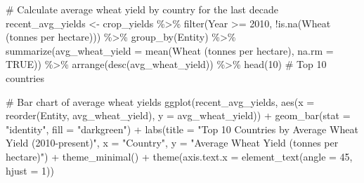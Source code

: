 \documentclass[
  letterpaper,
]{book}
\newenvironment{Shaded}{\begin{snugshade}}{\end{snugshade}}
\newcommand{\AttributeTok}[1]{\textcolor[rgb]{0.40,0.45,0.13}{#1}}
\newcommand{\CommentTok}[1]{\textcolor[rgb]{0.37,0.37,0.37}{#1}}
\newcommand{\ConstantTok}[1]{\textcolor[rgb]{0.56,0.35,0.01}{#1}}
\newcommand{\DecValTok}[1]{\textcolor[rgb]{0.68,0.00,0.00}{#1}}
\newcommand{\FunctionTok}[1]{\textcolor[rgb]{0.28,0.35,0.67}{#1}}
\newcommand{\NormalTok}[1]{\textcolor[rgb]{0.00,0.23,0.31}{#1}}
\newcommand{\OtherTok}[1]{\textcolor[rgb]{0.00,0.23,0.31}{#1}}
\newcommand{\SpecialCharTok}[1]{\textcolor[rgb]{0.37,0.37,0.37}{#1}}
\newcommand{\StringTok}[1]{\textcolor[rgb]{0.13,0.47,0.30}{#1}}
\begin{document}
\begin{Shaded}
\begin{Highlighting}[]
\CommentTok{\# Calculate average wheat yield by country for the last decade}
\NormalTok{recent\_avg\_yields }\OtherTok{\textless{}{-}}\NormalTok{ crop\_yields }\SpecialCharTok{\%\textgreater{}\%}
  \FunctionTok{filter}\NormalTok{(Year }\SpecialCharTok{\textgreater{}=} \DecValTok{2010}\NormalTok{, }\SpecialCharTok{!}\FunctionTok{is.na}\NormalTok{(}\StringTok{\textasciigrave{}}\AttributeTok{Wheat (tonnes per hectare)}\StringTok{\textasciigrave{}}\NormalTok{)) }\SpecialCharTok{\%\textgreater{}\%}
  \FunctionTok{group\_by}\NormalTok{(Entity) }\SpecialCharTok{\%\textgreater{}\%}
  \FunctionTok{summarize}\NormalTok{(}\AttributeTok{avg\_wheat\_yield =} \FunctionTok{mean}\NormalTok{(}\StringTok{\textasciigrave{}}\AttributeTok{Wheat (tonnes per hectare)}\StringTok{\textasciigrave{}}\NormalTok{, }\AttributeTok{na.rm =} \ConstantTok{TRUE}\NormalTok{)) }\SpecialCharTok{\%\textgreater{}\%}
  \FunctionTok{arrange}\NormalTok{(}\FunctionTok{desc}\NormalTok{(avg\_wheat\_yield)) }\SpecialCharTok{\%\textgreater{}\%}
  \FunctionTok{head}\NormalTok{(}\DecValTok{10}\NormalTok{)  }\CommentTok{\# Top 10 countries}

\CommentTok{\# Bar chart of average wheat yields}
\FunctionTok{ggplot}\NormalTok{(recent\_avg\_yields, }\FunctionTok{aes}\NormalTok{(}\AttributeTok{x =} \FunctionTok{reorder}\NormalTok{(Entity, avg\_wheat\_yield), }\AttributeTok{y =}\NormalTok{ avg\_wheat\_yield)) }\SpecialCharTok{+}
  \FunctionTok{geom\_bar}\NormalTok{(}\AttributeTok{stat =} \StringTok{"identity"}\NormalTok{, }\AttributeTok{fill =} \StringTok{"darkgreen"}\NormalTok{) }\SpecialCharTok{+}
  \FunctionTok{labs}\NormalTok{(}\AttributeTok{title =} \StringTok{"Top 10 Countries by Average Wheat Yield (2010{-}present)"}\NormalTok{, }
       \AttributeTok{x =} \StringTok{"Country"}\NormalTok{, }
       \AttributeTok{y =} \StringTok{"Average Wheat Yield (tonnes per hectare)"}\NormalTok{) }\SpecialCharTok{+}
  \FunctionTok{theme\_minimal}\NormalTok{() }\SpecialCharTok{+}
  \FunctionTok{theme}\NormalTok{(}\AttributeTok{axis.text.x =} \FunctionTok{element\_text}\NormalTok{(}\AttributeTok{angle =} \DecValTok{45}\NormalTok{, }\AttributeTok{hjust =} \DecValTok{1}\NormalTok{))}
\end{Highlighting}
\end{Shaded}
\end{document}
